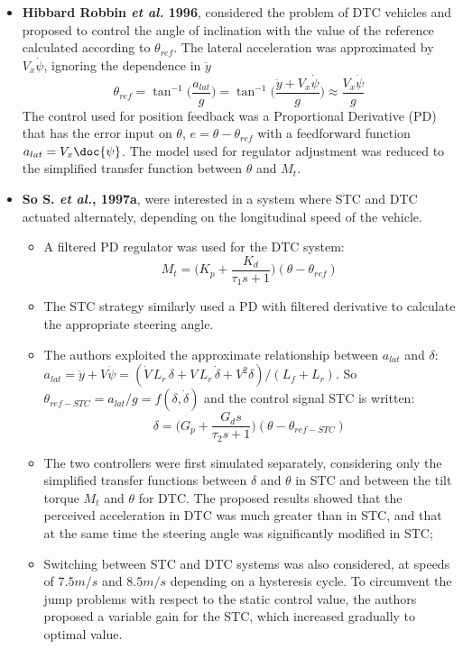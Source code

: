 \begin{itemize}
\begin{itemize}
	\item \textbf{Hibbard Robbin \textit{et al.} 1996}\cite{hibbard1996twenty}, considered the problem of DTC vehicles and proposed to control the angle of inclination with the value of the reference calculated according to $\theta_{ref}$. The lateral acceleration was approximated by $V_{x}\dot{\psi}$, ignoring the dependence in $\ddot{y}$
\[\theta_{ref}=\tan^{-1}\Big(\frac{a_{lat}}{g}\Big)=\tan^{-1}\Big(\frac{\ddot{y}+V_{x}\dot{\psi}}{g}\Big)\approx\frac{V_{x}\dot{\psi}}{g}\] The control used for position feedback was a Proportional Derivative (PD) that has the error input on $\theta$, $e=\theta-\theta_{ref}$ with a feedforward function $a_{lat}=V_{x}\doc{\psi}$. The model used for regulator adjustment was reduced to the simplified transfer function between $\theta$ and $M_t$.

\item \textbf{So S. \textit{et al.}, 1997a}\cite{doi:10.1080/00423119708969321}, were interested in a system where STC and DTC actuated alternately, depending on the longitudinal speed of the vehicle.
\begin{itemize}
\item A filtered PD regulator was used for the DTC system: \[M_{t}=\Big(K_{p}+\frac{K_{d}}{\tau_{1}s+1}\Big)(\theta-\theta_{ref})\]
\item The STC strategy similarly used a PD with filtered derivative to calculate the appropriate steering angle.
\item The authors exploited the approximate relationship between $a_{lat}$ and $\delta$: $a_{lat}=\ddot{y}+V\dot{\psi}=(\dot{V}\,L_{r}\,\delta+V\,L_{r}\,\dot{\delta}+V^{2}\delta)/(L_{f}+L_{r})$. So $\theta_{ref-STC}=a_{lat}/g=f(\delta,\dot{\delta})$ and the control signal STC is written: \[\delta=\Big(G_{p}+\frac{G_{d}s}{\tau_{2}s+1}\Big)(\theta-\theta_{ref-STC})\]
\item The two controllers were first simulated separately, considering only the simplified transfer functions between $\delta$ and $\theta$ in STC and between the tilt torque $M_t$ and $\theta$ for DTC. The proposed results showed that the perceived acceleration in DTC was much greater than in STC, and that at the same time the steering angle was significantly modified in STC; 
\item Switching between STC and DTC systems was also considered, at speeds of $7.5 m/s$ and $8.5m/s$ depending on a hysteresis cycle. To circumvent the jump problems with respect to the static control value, the authors proposed a variable gain for the STC, which increased gradually to optimal value.
\end{itemize}


\end{itemize}
\end{itemize}
